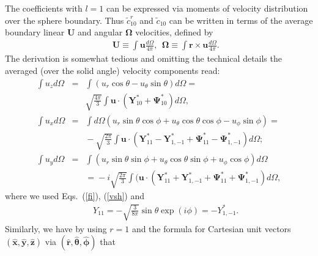 \documentclass[aps,prx,twocolumn,amsmath,amssymb,amsfonts]{revtex4-2}
\newcommand{\red}[1]{{\color{red}#1}}
\newcommand{\magenta}[1]{{\color{magenta}#1}}
\begin{document}
The coefficients with $l\!=\!1$ can be expressed via moments of velocity distribution over the sphere boundary. Thus ${\tilde c}^{r}_{10}$ and ${\tilde c}_{10}$ can be written in terms of the average boundary linear $\bm U$ and angular $\bm \Omega$ velocities, defined by
\begin{eqnarray}&&
\bm U \equiv \int \bm u \frac{d\Omega}{4\pi},\ \ \bm \Omega \equiv \int\bm r\times\bm u \frac{d\Omega}{4\pi}.
\end{eqnarray}
The derivation is somewhat tedious and omitting the technical details %
the averaged (over the solid angle) velocity components read:
\begin{eqnarray}
\int \!\! u_z d\Omega\!&=&\!\!\int \!\!\left(u_r\cos\theta\!-\!u_{\theta}\sin\theta\right) d\Omega\!=\nonumber \\
&& \!\!\!\!\!\!\!\!\!\!\!\!\!\sqrt{\frac{4\pi}{3}}\!\!\int \!\! \bm u\cdot \left(\bm Y_{10}^*\!+\!\bm \Psi_{10}^*\right)d\Omega, \nonumber \\
\int \!\! u_x d\Omega\!&=&\!\!\int \!\!d\Omega\left(u_r\sin\theta\cos\phi\!+\!u_{\theta}\cos\theta\cos\phi-u_{\phi}\sin\phi\right)\!= \nonumber \\
&& \!\!\!\!\!\!\!\!\!\!\!\!\!-\sqrt{\frac{2\pi}{3}}\!\int\!\! \bm u\!\cdot\!\left(\bm Y_{11}^*\!-\!\bm Y_{1, -1}^*\!+\!\bm \Psi_{11}^*\!-\!\bm \Psi_{1, -1}^*\right) d\Omega; \nonumber \\
\int \!\! u_y d\Omega\!&=&\!\int \!\!\left(u_r\sin\theta\sin\phi\!+\!u_{\theta}\cos\theta\sin\phi\!+\!u_{\phi}\cos\phi\right) d\Omega \nonumber \\
&&\!\!\!\!\!\!\!\!\!\!\!\!\!=\!-i\sqrt{\frac{2\pi}{3}}\int\!\! (\bm u\cdot\left(\bm Y_{11}^*\!+\!\bm Y_{1, -1}^*\!+\!\bm \Psi_{11}^*\!+\!\bm \Psi_{1, -1}^*\right) d\Omega,
\end{eqnarray}
where we used Eqs.~(\ref{fi}), (\ref{vsh}) and
\begin{eqnarray}&&
Y_{11}=-\sqrt{\frac{3}{8\pi}}\sin\theta\exp\left(i\phi\right)=-Y_{1,-1}^*.
\end{eqnarray}
Similarly, we have by using $r=1$ and the formula for Cartesian unit vectors $(\bm{\hat x}, \bm{\hat y}, \bm{\hat z})$ via $(\bm{\hat r}, \bm{\hat \theta}, \bm{\hat \phi})$ that
\end{document}
